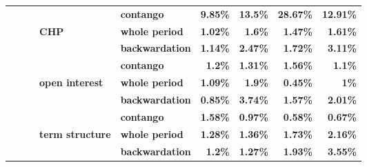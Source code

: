 \documentclass[
  authoryear,
  preprint,
  3p]{elsarticle}
\begin{document}
\begin{longtable}[t]{>{}l>{}l>{}l>{}l>{}l>{}r>{}r>{}r>{}r}
\textbf{} & \textbf{} & \textbf{} & \textbf{} & \textbf{contango} & \textcolor[HTML]{4285f4}{\textbf{9.85\%}} & \textcolor[HTML]{4285f4}{\textbf{13.5\%}} & \textcolor[HTML]{4285f4}{\textbf{28.67\%}} & \textcolor[HTML]{4285f4}{\textbf{12.91\%}}\\
\textbf{} & \textbf{} & \textbf{} & \textbf{CHP} & \textbf{whole period} & \textcolor[HTML]{4285f4}{\textbf{1.02\%}} & \textcolor[HTML]{4285f4}{\textbf{1.6\%}} & \textcolor[HTML]{4285f4}{\textbf{1.47\%}} & \textcolor[HTML]{4285f4}{\textbf{1.61\%}}\\
\textbf{} & \textbf{} & \textbf{} & \textbf{} & \textbf{backwardation} & \textcolor[HTML]{4285f4}{\textbf{1.14\%}} & \textcolor[HTML]{4285f4}{\textbf{2.47\%}} & \textcolor[HTML]{4285f4}{\textbf{1.72\%}} & \textcolor[HTML]{4285f4}{\textbf{3.11\%}}\\
\textbf{} & \textbf{} & \textbf{} & \textbf{} & \textbf{contango} & \textcolor[HTML]{4285f4}{\textbf{1.2\%}} & \textcolor[HTML]{4285f4}{\textbf{1.31\%}} & \textcolor[HTML]{4285f4}{\textbf{1.56\%}} & \textcolor[HTML]{4285f4}{\textbf{1.1\%}}\\
\addlinespace
\textbf{} & \textbf{} & \textbf{} & \textbf{open interest} & \textbf{whole period} & \textcolor[HTML]{4285f4}{\textbf{1.09\%}} & \textcolor[HTML]{4285f4}{\textbf{1.9\%}} & \textcolor[HTML]{4285f4}{\textbf{0.45\%}} & \textcolor[HTML]{4285f4}{\textbf{1\%}}\\
\textbf{} & \textbf{} & \textbf{} & \textbf{} & \textbf{backwardation} & \textcolor[HTML]{4285f4}{\textbf{0.85\%}} & \textcolor[HTML]{4285f4}{\textbf{3.74\%}} & \textcolor[HTML]{4285f4}{\textbf{1.57\%}} & \textcolor[HTML]{4285f4}{\textbf{2.01\%}}\\
\textbf{} & \textbf{} & \textbf{} & \textbf{} & \textbf{contango} & \textcolor[HTML]{4285f4}{\textbf{1.58\%}} & \textcolor[HTML]{4285f4}{\textbf{0.97\%}} & \textcolor[HTML]{4285f4}{\textbf{0.58\%}} & \textcolor[HTML]{4285f4}{\textbf{0.67\%}}\\
\textbf{} & \textbf{} & \textbf{} & \textbf{term structure} & \textbf{whole period} & \textcolor[HTML]{4285f4}{\textbf{1.28\%}} & \textcolor[HTML]{4285f4}{\textbf{1.36\%}} & \textcolor[HTML]{4285f4}{\textbf{1.73\%}} & \textcolor[HTML]{4285f4}{\textbf{2.16\%}}\\
\textbf{} & \textbf{} & \textbf{} & \textbf{} & \textbf{backwardation} & \textcolor[HTML]{4285f4}{\textbf{1.2\%}} & \textcolor[HTML]{4285f4}{\textbf{1.27\%}} & \textcolor[HTML]{4285f4}{\textbf{1.93\%}} & \textcolor[HTML]{4285f4}{\textbf{3.55\%}}\\

\end{longtable}
\end{document}
